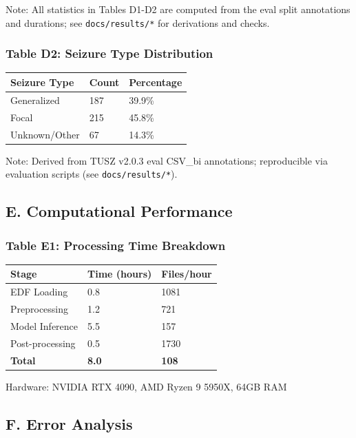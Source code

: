 \documentclass[
]{article}
\begin{document}
Note: All statistics in Tables D1-D2 are computed from the eval split
annotations and durations; see \texttt{docs/results/*} for derivations
and checks.

\hypertarget{table-d2-seizure-type-distribution}{%
\subsubsection{Table D2: Seizure Type
Distribution}\label{table-d2-seizure-type-distribution}}

\begin{longtable}[]{@{}lll@{}}
\toprule
Seizure Type & Count & Percentage\tabularnewline
\midrule
\endhead
Generalized & 187 & 39.9\%\tabularnewline
Focal & 215 & 45.8\%\tabularnewline
Unknown/Other & 67 & 14.3\%\tabularnewline
\bottomrule
\end{longtable}

Note: Derived from TUSZ v2.0.3 eval CSV\_bi annotations; reproducible
via evaluation scripts (see \texttt{docs/results/*}).

\hypertarget{e.-computational-performance}{%
\subsection{E. Computational
Performance}\label{e.-computational-performance}}

\hypertarget{table-e1-processing-time-breakdown}{%
\subsubsection{Table E1: Processing Time
Breakdown}\label{table-e1-processing-time-breakdown}}

\begin{longtable}[]{@{}lll@{}}
\toprule
Stage & Time (hours) & Files/hour\tabularnewline
\midrule
\endhead
EDF Loading & 0.8 & 1081\tabularnewline
Preprocessing & 1.2 & 721\tabularnewline
Model Inference & 5.5 & 157\tabularnewline
Post-processing & 0.5 & 1730\tabularnewline
\textbf{Total} & \textbf{8.0} & \textbf{108}\tabularnewline
\bottomrule
\end{longtable}

Hardware: NVIDIA RTX 4090, AMD Ryzen 9 5950X, 64GB RAM

\hypertarget{f.-error-analysis}{%
\subsection{F. Error Analysis}\label{f.-error-analysis}}
\end{document}
